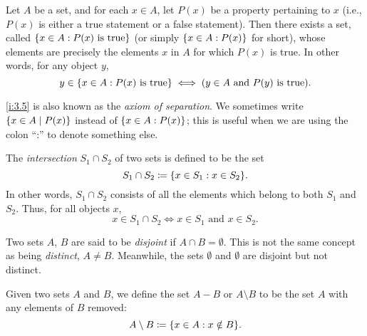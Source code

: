 \begin{ax}\label{i:3.5}
  Let \(A\) be a set, and for each \(x \in A\), let \(P(x)\) be a property pertaining to \(x\) (i.e., \(P(x)\) is either a true statement or a false statement).
  Then there exists a set, called \(\left\lbrace x \in A : P(x) \text{ is true}\right\rbrace\) (or simply \(\left\lbrace x \in A : P(x)\right\rbrace\) for short), whose elements are precisely the elements \(x\) in \(A\) for which \(P(x)\) is true.
  In other words, for any object \(y\),
  \[
    y \in \left\lbrace x \in A : P(x) \text{ is true}\right\rbrace \iff (y \in A \text{ and } P(y) \text{ is true}).
  \]
\end{ax}

\begin{note}
  \cref{i:3.5} is also known as the \emph{axiom of separation}.
  We sometimes write \(\left\lbrace x \in A \mid P(x)\right\rbrace\) instead of \(\left\lbrace x \in A : P(x)\right\rbrace\);
  this is useful when we are using the colon ``:'' to denote something else.
\end{note}

\setcounter{thm}{22}
\begin{defn}[Intersections]\label{i:3.1.23}
  The \emph{intersection} \(S_1 \cap S_2\) of two sets is defined to be the set
  \[
    S_1 \cap S_2 \coloneqq \set{x \in S_1 : x \in S_2}.
  \]
  In other words, \(S_1 \cap S_2\) consists of all the elements which belong to both \(S_1\) and \(S_2\).
  Thus, for all objects \(x\),
  \[
    x \in S_1 \cap S_2 \iff x \in S_1 \text{ and } x \in S_2.
  \]
\end{defn}

\begin{note}
  Two sets \(A\), \(B\) are said to be \emph{disjoint} if \(A \cap B = \emptyset\).
  This is not the same concept as being \emph{distinct}, \(A \neq B\).
  Meanwhile, the sets \(\emptyset\) and \(\emptyset\) are disjoint but not distinct.
\end{note}

\setcounter{thm}{26}
\begin{defn}\label{i:3.1.27}
  Given two sets \(A\) and \(B\), we define the set \(A - B\) or \(A \setminus B\) to be the set \(A\) with any elements of \(B\) removed:
  \[
    A \setminus B \coloneqq \set{x \in A : x \notin B}.
  \]
\end{defn}

